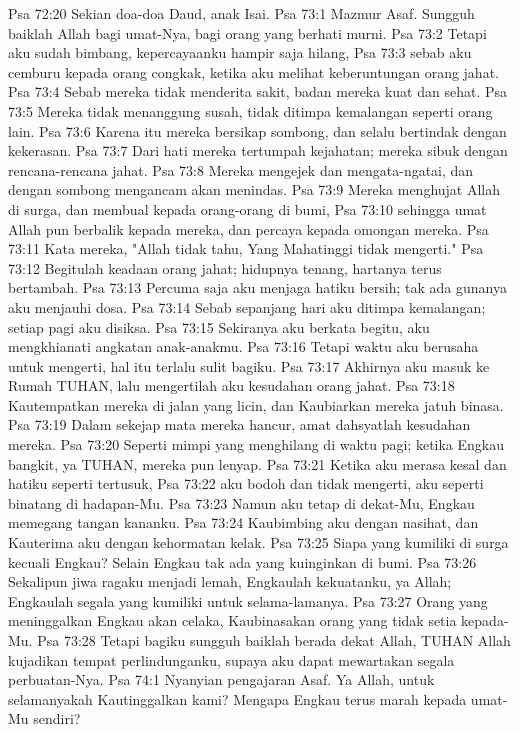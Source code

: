 Psa 72:20  Sekian doa-doa Daud, anak Isai.
Psa 73:1  Mazmur Asaf. Sungguh baiklah Allah bagi umat-Nya, bagi orang yang berhati murni.
Psa 73:2  Tetapi aku sudah bimbang, kepercayaanku hampir saja hilang,
Psa 73:3  sebab aku cemburu kepada orang congkak, ketika aku melihat keberuntungan orang jahat.
Psa 73:4  Sebab mereka tidak menderita sakit, badan mereka kuat dan sehat.
Psa 73:5  Mereka tidak menanggung susah, tidak ditimpa kemalangan seperti orang lain.
Psa 73:6  Karena itu mereka bersikap sombong, dan selalu bertindak dengan kekerasan.
Psa 73:7  Dari hati mereka tertumpah kejahatan; mereka sibuk dengan rencana-rencana jahat.
Psa 73:8  Mereka mengejek dan mengata-ngatai, dan dengan sombong mengancam akan menindas.
Psa 73:9  Mereka menghujat Allah di surga, dan membual kepada orang-orang di bumi,
Psa 73:10  sehingga umat Allah pun berbalik kepada mereka, dan percaya kepada omongan mereka.
Psa 73:11  Kata mereka, "Allah tidak tahu, Yang Mahatinggi tidak mengerti."
Psa 73:12  Begitulah keadaan orang jahat; hidupnya tenang, hartanya terus bertambah.
Psa 73:13  Percuma saja aku menjaga hatiku bersih; tak ada gunanya aku menjauhi dosa.
Psa 73:14  Sebab sepanjang hari aku ditimpa kemalangan; setiap pagi aku disiksa.
Psa 73:15  Sekiranya aku berkata begitu, aku mengkhianati angkatan anak-anakmu.
Psa 73:16  Tetapi waktu aku berusaha untuk mengerti, hal itu terlalu sulit bagiku.
Psa 73:17  Akhirnya aku masuk ke Rumah TUHAN, lalu mengertilah aku kesudahan orang jahat.
Psa 73:18  Kautempatkan mereka di jalan yang licin, dan Kaubiarkan mereka jatuh binasa.
Psa 73:19  Dalam sekejap mata mereka hancur, amat dahsyatlah kesudahan mereka.
Psa 73:20  Seperti mimpi yang menghilang di waktu pagi; ketika Engkau bangkit, ya TUHAN, mereka pun lenyap.
Psa 73:21  Ketika aku merasa kesal dan hatiku seperti tertusuk,
Psa 73:22  aku bodoh dan tidak mengerti, aku seperti binatang di hadapan-Mu.
Psa 73:23  Namun aku tetap di dekat-Mu, Engkau memegang tangan kananku.
Psa 73:24  Kaubimbing aku dengan nasihat, dan Kauterima aku dengan kehormatan kelak.
Psa 73:25  Siapa yang kumiliki di surga kecuali Engkau? Selain Engkau tak ada yang kuinginkan di bumi.
Psa 73:26  Sekalipun jiwa ragaku menjadi lemah, Engkaulah kekuatanku, ya Allah; Engkaulah segala yang kumiliki untuk selama-lamanya.
Psa 73:27  Orang yang meninggalkan Engkau akan celaka, Kaubinasakan orang yang tidak setia kepada-Mu.
Psa 73:28  Tetapi bagiku sungguh baiklah berada dekat Allah, TUHAN Allah kujadikan tempat perlindunganku, supaya aku dapat mewartakan segala perbuatan-Nya.
Psa 74:1  Nyanyian pengajaran Asaf. Ya Allah, untuk selamanyakah Kautinggalkan kami? Mengapa Engkau terus marah kepada umat-Mu sendiri?
